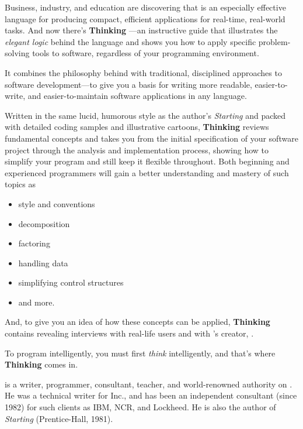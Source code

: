 
\clearpage\if@twoside \ifodd\c@page\hbox{}\newpage\fi\fi\thispagestyle{empty}
\noindent
Business, industry, and education are discovering that \Forth{} is an
especially effective language for producing compact, efficient
applications for real-time, real-world tasks. And now there's
\textbf{Thinking \Forth}---an instructive guide that illustrates the
\emph{elegant logic} behind the language and shows you how to apply
specific problem-solving tools to software, regardless of your
programming environment.

It combines the philosophy behind \Forth{} with traditional,
disciplined approaches to software development---to give you a basis
for writing more readable, easier-to-write, and easier-to-maintain
software applications in any language.

Written in the same lucid, humorous style as the author's
\emph{Starting \Forth} and packed with detailed coding samples and
illustrative cartoons, \textbf{Thinking \Forth} reviews fundamental
\Forth{} concepts and takes you from the initial specification of your
software project through the analysis and implementation process,
showing how to simplify your program and still keep it flexible
throughout. Both beginning and experienced programmers will gain a
better understanding and mastery of such topics as
\begin{itemize}
\item \Forth{} style and conventions
\item decomposition
\item factoring
\item handling data
\item simplifying control structures
\item and more.
\end{itemize}

And, to give you an idea of how these concepts can be applied,
\textbf{Thinking \Forth} contains revealing interviews with real-life
users and with \Forth's creator, .

To program intelligently, you must first \emph{think} intelligently,
and that's where \textbf{Thinking \Forth} comes in.

\textbf{} is a writer, programmer, consultant,
teacher, and world-renowned authority on \Forth. He was a technical
writer for \Forth{} Inc., and has been an independent consultant
(since 1982) for such clients as IBM, NCR, and Lockheed. He is also
the author of \emph{Starting \Forth} (Prentice-Hall, 1981).
